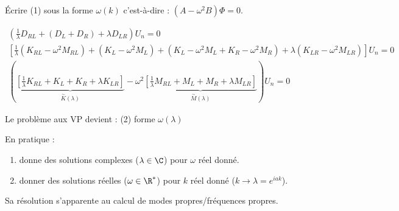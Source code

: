 \documentclass[12pt,a4paper]{article}
\begin{document}
	\begin{ex} $ $\\
		Écrire (1) sous la forme $\omega(k)$ c'est-à-dire : $(A-\omega^2B)\Phi = 0$.
	\end{ex}
	\begin{sol}
		\[\begin{aligned}
			\left(\frac{1}{\lambda}D_{RL}+(D_L+D_R)+\lambda D_{LR}\right)U_n = 0 \\
			\left[\frac{1}{\lambda}(K_{RL}-\omega^2M_{RL})+(K_L-\omega^2M_L)+(K_L-\omega^2M_L+K_R-\omega^2M_R)+\lambda(K_{LR}-\omega^2M_{LR})\right]U_n = 0\\
			\left(\underbrace{\left[\frac{1}{\lambda}K_{RL}+K_L+K_R+\lambda K_{LR}\right]}_{\overset{\sim}{K}(\lambda)}-\omega^2\underbrace{\left[\frac{1}{\lambda}M_{RL}+M_L+M_R+\lambda M_{LR}\right]}_{\overset{\sim}{M}(\lambda)}\right)U_n = 0
		\end{aligned}\]
		
		\begin{minipage}[t]{18cm}
			Le problème aux VP devient :  (2) forme $\omega(\lambda)$
		\end{minipage}
		
		En pratique : \begin{minipage}[t]{15cm}
			
			\vspace{-.3cm}
			
			\begin{enumerate}
				\item donne des solutions complexes ($\lambda \in \C$) pour $\omega$ réel donné.
				\item donner des solutions réelles ($\omega \in \R^*$) pour $k$ réel donné ($k \to \lambda = e^{iak}$).
			\end{enumerate}
			Sa résolution s'apparente au calcul de modes propres/fréquences propres.
		\end{minipage}
	\end{sol}
	
\end{document}
